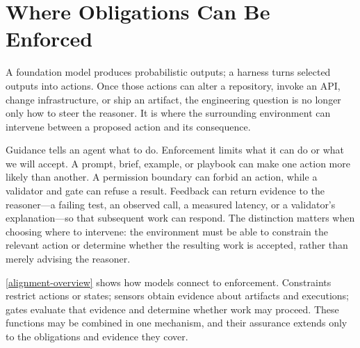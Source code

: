 


\chapter{Where Obligations Can Be Enforced}



A foundation model produces probabilistic outputs; a harness turns selected outputs into actions. Once those actions can alter a repository, invoke an API, change infrastructure, or ship an artifact, the engineering question is no longer only how to steer the reasoner. It is where the surrounding environment can intervene between a proposed action and its consequence.



Guidance tells an agent what to do. Enforcement limits what it can do or what we will accept. A prompt, brief, example, or playbook can make one action more likely than another. A permission boundary can forbid an action, while a validator and gate can refuse a result. Feedback can return evidence to the reasoner---a failing test, an observed call, a measured latency, or a validator's explanation---so that subsequent work can respond. The distinction matters when choosing where to intervene: the environment must be able to constrain the relevant action or determine whether the resulting work is accepted, rather than merely advising the reasoner.

\autoref{alignment-overview} shows how models connect to enforcement. Constraints restrict actions or states; sensors obtain evidence about artifacts and executions; gates evaluate that evidence and determine whether work may proceed. These functions may be combined in one mechanism, and their assurance extends only to the obligations and evidence they cover.

